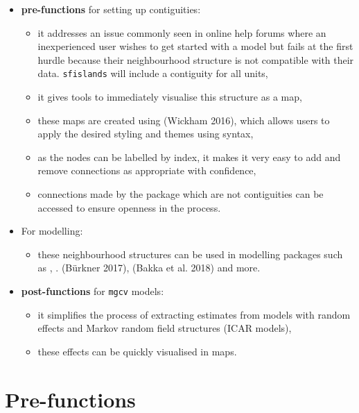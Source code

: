 \begin{itemize}
\item
  \textbf{pre-functions} for setting up contiguities:

  \begin{itemize}
  \item
    it addresses an issue commonly seen in online help forums where an inexperienced user wishes to get started with a model but fails at the first hurdle because their neighbourhood structure is not compatible with their data. \texttt{sfislands} will include a contiguity for all units,
  \item
    it gives tools to immediately visualise this structure as a map,
  \item
    these maps are created using  (Wickham 2016), which allows users to apply the desired styling and themes using  syntax,
  \item
    as the nodes can be labelled by index, it makes it very easy to add and remove connections as appropriate with confidence,
  \item
    connections made by the package which are not contiguities can be accessed to ensure openness in the process.
  \end{itemize}
\item
  For modelling:

  \begin{itemize}
  \tightlist
  \item
    these neighbourhood structures can be used in modelling packages such as , . (Bürkner 2017),  (Bakka et al. 2018) and more.
  \end{itemize}
\item
  \textbf{post-functions} for \texttt{mgcv} models:

  \begin{itemize}
  \item
    it simplifies the process of extracting estimates from models with random effects and Markov random field structures (ICAR models),
  \item
    these effects can be quickly visualised in  maps.
  \end{itemize}
\end{itemize}

\hypertarget{pre-functions}{%
\section{Pre-functions}\label{pre-functions}}

